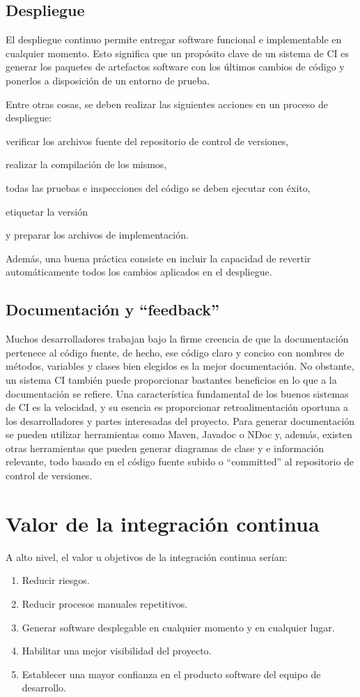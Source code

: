 \subsection{Despliegue}
El despliegue continuo permite entregar software funcional e implementable en cualquier momento. Esto significa que un propósito clave de un sistema de CI es generar los paquetes de artefactos software con los últimos cambios de código y ponerlos a disposición de un entorno de prueba. 

Entre otras cosas, se deben realizar las siguientes acciones en un proceso de despliegue:
\begin{compactitem}
    \item verificar los archivos fuente del repositorio de control de versiones, 
    \item realizar la compilación de los mismos, 
    \item todas las pruebas e inspecciones del código se deben ejecutar con éxito,
    \item etiquetar la versión
    \item y preparar los archivos de implementación.
\end{compactitem}

Además, una buena práctica consiste en incluir la capacidad de revertir automáticamente todos los cambios aplicados en el despliegue.

\subsection{Documentación y “feedback”}
Muchos desarrolladores trabajan bajo la firme creencia de que la documentación pertenece al código fuente, de hecho, ese código claro y conciso con nombres de métodos, variables y clases bien elegidos es la mejor documentación. No obstante, un sistema CI también puede proporcionar bastantes beneficios en lo que a la documentación se refiere. Una característica fundamental de los buenos sistemas de CI es la velocidad, y su esencia es proporcionar retroalimentación oportuna a los desarrolladores y partes interesadas del proyecto. Para generar documentación se pueden utilizar herramientas como Maven, Javadoc o NDoc y, además, existen otras herramientas que pueden generar diagramas de clase y e información relevante, todo basado en el código fuente subido o “committed” al repositorio de control de versiones.

\section{Valor de la integración continua}
A alto nivel, el valor u objetivos de la integración continua serían:
\begin{enumerate}
    \item Reducir riesgos.
    \item Reducir procesos manuales repetitivos.
    \item Generar software desplegable en cualquier momento y en cualquier lugar.
    \item Habilitar una mejor visibilidad del proyecto.
    \item Establecer una mayor confianza en el producto software del equipo de desarrollo.
\end{enumerate}
